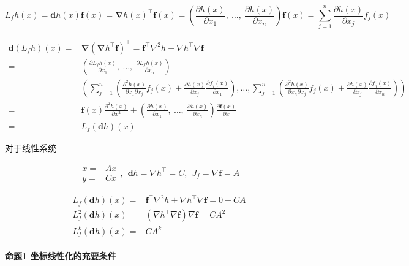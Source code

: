 \documentclass[
  12pt,
  a4paper
]{article}
\begin{document}
\[L_{f}h(x) = \mathbf{d}h(x)\mathbf{f}(x) = \mathbf{\nabla}h(x)^{\top}\mathbf{f}(x) = \left( \frac{\partial h(x)}{\partial x_{1}},\ \ldots,\ \frac{\partial h(x)}{\partial x_{n}} \right)\mathbf{f}(x) = \sum_{j = 1}^{n}{\frac{\partial h(x)}{\partial x_{j}}f_{j}(x)}\]

\[\begin{aligned}
\mathbf{d}\left( L_{f}h \right)(x) = & \mathbf{\nabla}\left( \mathbf{\nabla}h^{\top}\mathbf{f} \right)^{\top} = \mathbf{f}^{\top}\nabla^{2}h + \nabla h^{\top}\nabla\mathbf{f} \\
 = & \left( \frac{\partial L_{f}h(x)}{\partial x_{1}},\ \ldots,\ \frac{\partial L_{f}h(x)}{\partial x_{n}} \right) \\
 = & \left( \sum_{j = 1}^{n}\left( \frac{\partial^{2}h(x)}{\partial x_{1}\partial x_{j}}f_{j}(x) + \frac{\partial h(x)}{\partial x_{j}}\frac{\partial f_{j}(x)}{\partial x_{1}} \right),\ldots,\sum_{j = 1}^{n}\left( \frac{\partial^{2}h(x)}{\partial x_{n}\partial x_{j}}f_{j}(x) + \frac{\partial h(x)}{\partial x_{j}}\frac{\partial f_{j}(x)}{\partial x_{n}} \right) \right) \\
 = & \mathbf{f}(x)\frac{\partial^{2}h(x)}{\partial x^{2}} + \left( \frac{\partial h(x)}{\partial x_{1}},\ \ldots,\ \frac{\partial h(x)}{\partial x_{n}} \right)\frac{\partial\mathbf{f}(x)}{\partial x} \\
 = & L_{f}\left( \mathbf{d}h \right)(x)
\end{aligned}\]

对于线性系统

\[\begin{aligned}
\dot{x} = & Ax \\
y = & Cx
\end{aligned},\ \ \mathbf{d}h = \nabla h^{\top} = C,\ \ J_{f} = \nabla\mathbf{f} = A\]

\[\begin{aligned}
L_{f}\left( \mathbf{d}h \right)(x) = & \mathbf{f}^{\top}\nabla^{2}h + \nabla h^{\top}\nabla\mathbf{f} = 0 + CA \\
L_{f}^{2}\left( \mathbf{d}h \right)(x) = & \left( \nabla h^{\top}\nabla\mathbf{f} \right)\nabla\mathbf{f =}CA^{2} \\
L_{f}^{k}\left( \mathbf{d}h \right)(x) = & CA^{k}
\end{aligned}\]

\paragraph{命题1
坐标线性化的充要条件}\label{ux547dux98981-ux5750ux6807ux7ebfux6027ux5316ux7684ux5145ux8981ux6761ux4ef6}
\end{document}
